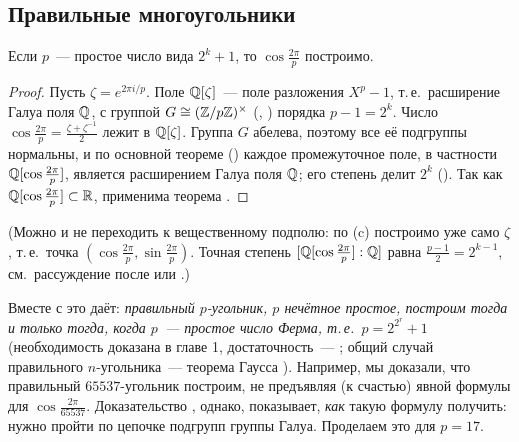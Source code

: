 \subsection*{Правильные многоугольники}

\begin{corollary}[3.26]
Если $p$~--- простое число вида $2^k+1$, то $\cos\frac{2\pi}p$ построимо.
\end{corollary}

\begin{proof}
Пусть $\zeta=e^{2\pi i/p}$. Поле $\mathbb Q[\zeta]$~--- поле разложения $X^p-1$, т.\,е.\ расширение Галуа поля $\mathbb Q$, с группой
$G\cong(\mathbb Z/p\mathbb Z)^\times$ (, ) порядка $p-1=2^k$. Число $\cos\frac{2\pi}p=\frac{\zeta+\zeta^{-1}}2$ лежит в
$\mathbb Q[\zeta]$. Группа $G$ абелева, поэтому все её подгруппы нормальны, и по основной теореме () каждое
промежуточное поле, в частности $\mathbb Q[\cos\frac{2\pi}p]$, является расширением Галуа поля $\mathbb Q$; его степень делит $2^k$
(). Так как $\mathbb Q[\cos\frac{2\pi}p]\subset\mathbb R$, применима теорема .
\end{proof}

(Можно и не переходить к вещественному подполю: по (c) построимо уже само $\zeta$, т.\,е.\ точка
$(\cos\frac{2\pi}p,\sin\frac{2\pi}p)$. Точная степень $[\mathbb Q[\cos\frac{2\pi}p]:\mathbb Q]$ равна $\frac{p-1}2=2^{k-1}$, см.\ рассуждение после  или .)

Вместе с  это даёт: \emph{правильный $p$-угольник, $p$ нечётное простое, построим тогда и только тогда, когда
$p$~--- простое число Ферма, т.\,е.\ $p=2^{2^r}+1$} (необходимость доказана в главе 1, достаточность~--- ; общий
случай правильного $n$-угольника~--- теорема Гаусса ). Например, мы доказали, что правильный
$65537$-угольник построим, не предъявляя (к счастью) явной формулы для $\cos\frac{2\pi}{65537}$. Доказательство
, однако, показывает, \emph{как} такую формулу получить: нужно пройти по цепочке подгрупп группы Галуа. Проделаем
это для $p=17$.

